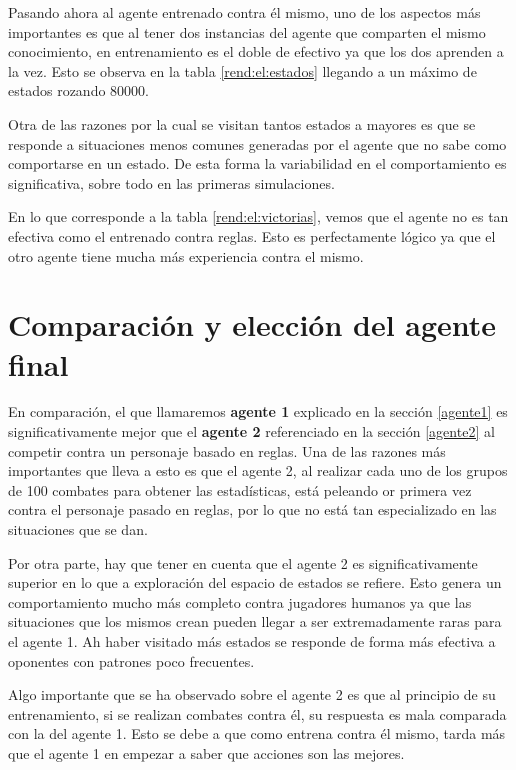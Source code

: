 Pasando ahora al agente entrenado contra él mismo, uno de los aspectos más importantes es que al tener dos instancias del agente que comparten el mismo conocimiento, en entrenamiento es el doble de efectivo ya que los dos aprenden a la vez. Esto se observa en la tabla \ref{rend:el:estados} llegando a un máximo de estados rozando 80000.

\bigskip

Otra de las razones por la cual se visitan tantos estados a mayores es que se responde a situaciones menos comunes generadas por el agente que no sabe como comportarse en un estado. De esta forma la variabilidad en el comportamiento es significativa, sobre todo en las primeras simulaciones.

\bigskip

En lo que corresponde a la tabla \ref{rend:el:victorias}, vemos que el agente no es tan efectiva como el entrenado contra reglas. Esto es perfectamente lógico ya que el otro agente tiene mucha más experiencia contra el mismo.


\section{Comparación y elección del agente final}

En comparación, el que llamaremos \textbf{agente 1} explicado en la sección \ref{agente1} es significativamente mejor que el \textbf{agente 2} referenciado en la sección \ref{agente2} al competir contra un personaje basado en reglas. Una de las razones más importantes que lleva a esto es que el agente 2, al realizar cada uno de los grupos de 100 combates para obtener las estadísticas, está peleando or primera vez contra el personaje pasado en reglas, por lo que no está tan especializado en las situaciones que se dan.

\bigskip

Por otra parte, hay que tener en cuenta que el agente 2 es significativamente superior en lo que a exploración del espacio de estados se refiere. Esto genera un comportamiento mucho más completo contra jugadores humanos ya que las situaciones que los mismos crean pueden llegar a ser extremadamente raras para el agente 1. Ah haber visitado más estados se responde de forma más efectiva a oponentes con patrones poco frecuentes.

\bigskip

Algo importante que se ha observado sobre el agente 2 es que al principio de su entrenamiento, si se realizan combates contra él, su respuesta es mala comparada con la del agente 1. Esto se debe a que como entrena contra él mismo, tarda más que el agente 1 en empezar a saber que acciones son las mejores.

